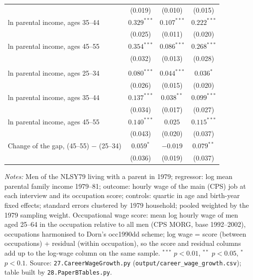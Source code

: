 \begin{table}[!htbp]
{{\begin{tabular}{lccc}
 & (0.019) & (0.010) & (0.015) \\
ln parental income, ages 35--44 & $0.329^{***}$ & $0.107^{***}$ & $0.222^{***}$ \\
 & (0.025) & (0.011) & (0.020) \\
ln parental income, ages 45--55 & $0.354^{***}$ & $0.086^{***}$ & $0.268^{***}$ \\
 & (0.032) & (0.013) & (0.028) \\
\addlinespace
\multicolumn{4}{l}{\textit{White $-$ Black}} \\
ln parental income, ages 25--34 & $0.080^{***}$ & $0.044^{***}$ & $0.036^{*}$ \\
 & (0.026) & (0.015) & (0.020) \\
ln parental income, ages 35--44 & $0.137^{***}$ & $0.038^{**}$ & $0.099^{***}$ \\
 & (0.034) & (0.017) & (0.027) \\
ln parental income, ages 45--55 & $0.140^{***}$ & $0.025$ & $0.115^{***}$ \\
 & (0.043) & (0.020) & (0.037) \\
Change of the gap, (45--55) $-$ (25--34) & $0.059^{*}$ & $-0.019$ & $0.079^{**}$ \\
 & (0.036) & (0.019) & (0.037) \\
\bottomrule
\end{tabular}}}
\par\smallskip
\begin{minipage}{\textwidth}\footnotesize \textit{Notes:} Men of the NLSY79 living with a parent in 1979; regressor: log mean parental family income 1979--81; outcome: hourly wage of the main (CPS) job at each interview and its occupation score; controls: quartic in age and birth-year fixed effects; standard errors clustered by 1979 household; pooled weighted by the 1979 sampling weight. Occupational wage score: mean log hourly wage of men aged 25--64 in the occupation relative to all men (CPS MORG, base 1992--2002), occupations harmonised to Dorn's occ1990dd scheme; log wage = score (between occupations) + residual (within occupation), so the score and residual columns add up to the log-wage column on the same sample. $^{***}$ $p<0.01$, $^{**}$ $p<0.05$, $^{*}$ $p<0.1$. Source: \texttt{27.CareerWageGrowth.py} (\texttt{output/career\_wage\_growth.csv}); table built by \texttt{28.PaperBTables.py}.\end{minipage}
\end{table}
